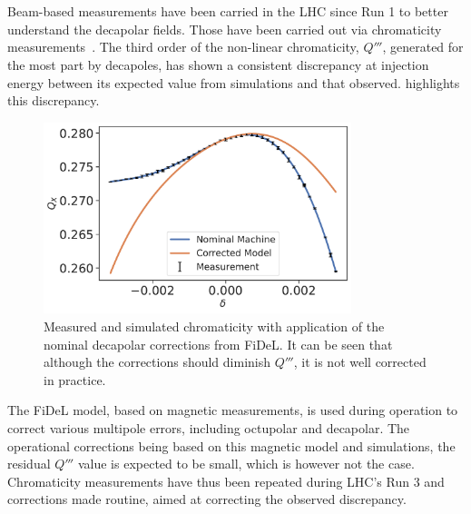 \section{}


\subsection{}

Beam-based measurements have been carried in the LHC since Run 1 to better understand the decapolar
fields. Those have been carried out via chromaticity
measurements~\cite{maclean_non-linear_2011,maclean_commissioning_2016,maclean_measurement_2014}. 
The third order of the non-linear chromaticity, $Q'''$, generated for the most part by decapoles,
has shown a consistent discrepancy at injection energy between its expected value from simulations
and that observed.  highlights this
discrepancy.

\begin{figure}[!htb]
    \centering
    \includegraphics[width=0.8\textwidth]{images/dq3_corrected_simulation_fidel.pdf}
    \caption{Measured and simulated chromaticity with application of the nominal decapolar
    corrections from FiDeL. It can be seen that although the corrections should diminish $Q'''$, it
    is not well corrected in practice.}
    \label{fig:decapoles:bare_chroma_vs_simulations}
\end{figure}

The FiDeL model, based on magnetic measurements, is used during operation to correct various
multipole errors, including octupolar and decapolar. The operational corrections being based on this
magnetic model and simulations, the residual $Q'''$ value is expected to be small, which is however
not the case.  Chromaticity measurements have thus been repeated during LHC's Run 3 and corrections
made routine, aimed at correcting the observed discrepancy.


